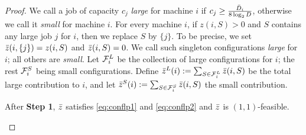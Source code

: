 \begin{proof}
		We call a job of capacity $c_j$ {\em large} for machine $i$ if $c_j \geq \frac{\bar{D}_i}{8\log_2 D}$, otherwise we call it \emph{small} for machine $i$. 
%	
%		
%
%				
%
For every machine $i$, if $z(i,S) > 0$ and $S$ contains any large job $j$ for $i$, then we replace $S$ by $\{j\}$. To be precise, we set $\bar z(i,\{j\}) = z(i,S)$ and $\bar z(i,S) = 0$.
We call such singleton configurations {\em large} for $i$; all others are {\em small}. %
Let ${\cal F}^L_i$ be the collection of large configurations for $i$; the rest ${\cal F}^S_i$ being small configurations.
Define $\bar z^L(i) := \sum_{S\in {\cal F}^L_i} \bar z(i,S)$ be the total large contribution to $i$, and let $\bar z^S(i) := \sum_{S\in {\cal F}^S_i} \bar z(i,S)$ the small contribution.

\begin{claim}\label{clm:step1}
	After {\bf Step 1}, $\bar z$ satisfies \eqref{eq:conflp1} and \eqref{eq:conflp2} and $\bar z$ is $(1,1)$-feasible.
\end{claim}

 	
	
%	


\end{proof}
